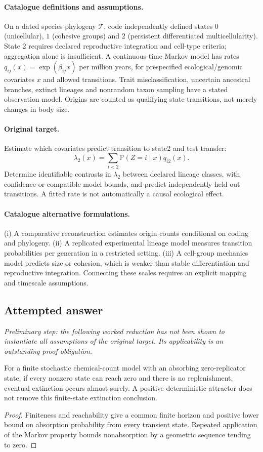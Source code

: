 \documentclass[11pt]{article}
\begin{document}
\paragraph{Catalogue definitions and assumptions.}
On a dated species phylogeny $\mathcal T$, code independently defined states $0$ (unicellular), $1$ (cohesive groups) and $2$ (persistent differentiated multicellularity). State 2 requires declared reproductive integration and cell-type criteria; aggregation alone is insufficient. A continuous-time Markov model has rates $q_{ij}(x)=\exp(\beta_{ij}^{\top}x)$ per million years, for prespecified ecological/genomic covariates $x$ and allowed transitions. Trait misclassification, uncertain ancestral branches, extinct lineages and nonrandom taxon sampling have a stated observation model. Origins are counted as qualifying state transitions, not merely changes in body size.
\paragraph{Original target.}
Estimate which covariates predict transition to state2 and test transfer:
    \[\lambda_2(x)=\sum_{i<2}\mathbb{P}(Z=i\mid x)q_{i2}(x).\]
    Determine identifiable contrasts in $\lambda_2$ between declared lineage classes, with confidence or compatible-model bounds, and predict independently held-out transitions. A fitted rate is not automatically a causal ecological effect.
\paragraph{Catalogue alternative formulations.}
(i) A comparative reconstruction estimates origin counts conditional on coding and phylogeny. (ii) A replicated experimental lineage model measures transition probabilities per generation in a restricted setting. (iii) A cell-group mechanics model predicts size or cohesion, which is weaker than stable differentiation and reproductive integration. Connecting these scales requires an explicit mapping and timescale assumptions.
\subsection{Attempted answer}
\noindent\emph{Preliminary step: the following worked reduction has not been shown to instantiate all assumptions of the original target. Its applicability is an outstanding proof obligation.}

\begin{proposition}
For a finite stochastic chemical-count model with an absorbing zero-replicator state, if every nonzero state can reach zero and there is no replenishment, eventual extinction occurs almost surely. A positive deterministic attractor does not remove this finite-state extinction conclusion.
\end{proposition}
\begin{proof}
Finiteness and reachability give a common finite horizon and positive lower bound on absorption probability from every transient state. Repeated application of the Markov property bounds nonabsorption by a geometric sequence tending to zero.
\end{proof}
\end{document}
